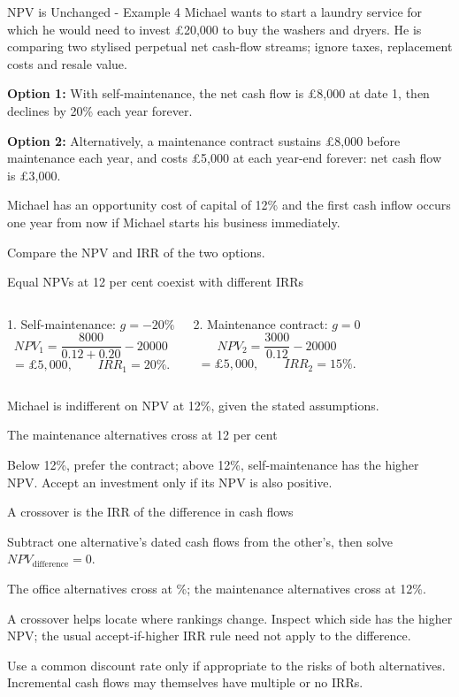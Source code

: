\documentclass[9pt,aspectratio=169]{beamer}
\newenvironment{wideitemize}{\itemize\addtolength{\itemsep}{10pt}}{\enditemize}
\begin{document}
\begin{frame}{NPV is Unchanged - Example 4}
Michael wants to start a laundry service for which he would need to invest £20,000 to buy the washers and dryers. He is comparing two stylised perpetual net cash-flow streams; ignore taxes, replacement costs and resale value.

\textbf{Option 1:} With self-maintenance, the net cash flow is £8,000 at date 1, then declines by 20\% each year forever.

\textbf{Option 2:} Alternatively, a maintenance contract sustains £8,000 before maintenance each year, and costs £5,000 at each year-end forever: net cash flow is £3,000.

Michael has an opportunity cost of capital of 12\% and the first cash inflow occurs one year from now if Michael starts his business immediately.

Compare the NPV and IRR of the two options.
\end{frame}

\begin{frame}{Equal NPVs at 12 per cent coexist with different IRRs}
\begin{columns}[T,onlytextwidth]
\begin{block}{1. Self-maintenance: $g=-20\%$}
\[NPV_1=\frac{8000}{0.12+0.20}-20000\]
\[=\text{£}5,000,\qquad IRR_1=20\%.\]
\end{block}
\begin{block}{2. Maintenance contract: $g=0$}
\[NPV_2=\frac{3000}{0.12}-20000\]
\[=\text{£}5,000,\qquad IRR_2=15\%.\]
\end{block}
\end{columns}
Michael is indifferent on NPV at 12\%, given the stated assumptions.
\end{frame}

\begin{frame}{The maintenance alternatives cross at 12 per cent}
\begin{center}\end{center}
Below 12\%, prefer the contract; above 12\%, self-maintenance has the higher NPV. Accept an investment only if its NPV is also positive.
\end{frame}

\begin{frame}{A crossover is the IRR of the difference in cash flows}
\begin{wideitemize}
\item Subtract one alternative's dated cash flows from the other's, then solve $NPV_{\mathrm{difference}}=0$.
\item The office alternatives cross at \CrossRate\%; the maintenance alternatives cross at 12\%.
\item A crossover helps locate where rankings change. Inspect which side has the higher NPV; the usual accept-if-higher IRR rule need not apply to the difference.
\item Use a common discount rate only if appropriate to the risks of both alternatives. Incremental cash flows may themselves have multiple or no IRRs.
\end{wideitemize}
\end{frame}
\end{document}
